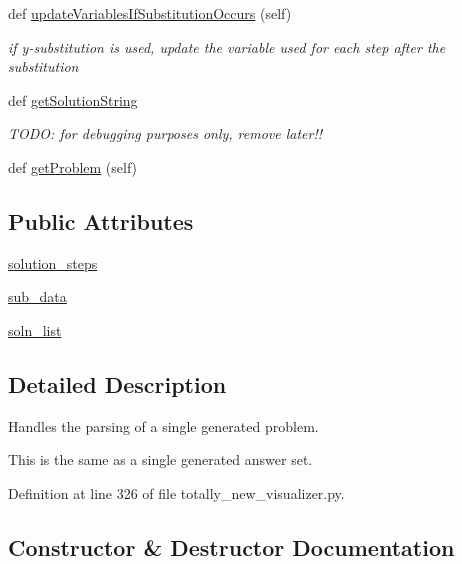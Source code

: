 \begin{DoxyCompactItemize}
def \hyperlink{classtotally__new__visualizer_1_1_problem_parser_afcfb1a63e8fe352e8e9a2737ea1654f5}{update\+Variables\+If\+Substitution\+Occurs} (self)
\begin{DoxyCompactList}\small\item\em if y-\/substitution is used, update the variable used for each step after the substitution \end{DoxyCompactList}\item 
def \hyperlink{classtotally__new__visualizer_1_1_problem_parser_a922001a638e085fc2ab3e08254eb60de}{get\+Solution\+String}
\begin{DoxyCompactList}\small\item\em T\+O\+D\+O\+: for debugging purposes only, remove later!! \end{DoxyCompactList}\item 
def \hyperlink{classtotally__new__visualizer_1_1_problem_parser_a07434850dc97a708cd945df0e3be195d}{get\+Problem} (self)
\end{DoxyCompactItemize}
\subsection*{Public Attributes}
\begin{DoxyCompactItemize}
\item 
\hyperlink{classtotally__new__visualizer_1_1_problem_parser_a2922e97837374aee68052070231aa978}{solution\+\_\+steps}
\item 
\hyperlink{classtotally__new__visualizer_1_1_problem_parser_a63fff6bd2c3015c278433317fc7c8e32}{sub\+\_\+data}
\item 
\hyperlink{classtotally__new__visualizer_1_1_problem_parser_a27138f0c72c9ab44f6e951b63159b05f}{soln\+\_\+list}
\end{DoxyCompactItemize}


\subsection{Detailed Description}
Handles the parsing of a single generated problem. 

This is the same as a single generated answer set. 

Definition at line 326 of file totally\+\_\+new\+\_\+visualizer.\+py.



\subsection{Constructor \& Destructor Documentation}
\hypertarget{classtotally__new__visualizer_1_1_problem_parser_a8c74392fb4a04b5c3215fa594c1a223d}{}
